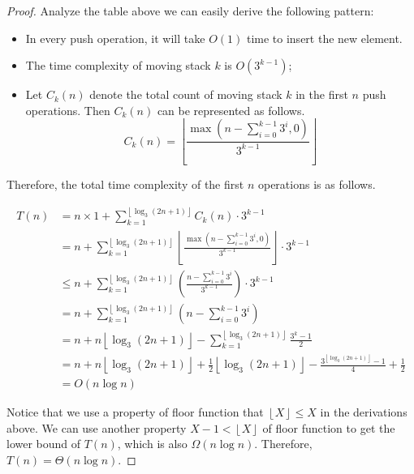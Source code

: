 \documentclass[12pt,a4paper]{article}
\theoremstyle{definition}
\begin{document}
\begin{enumerate}
\begin{enumerate}
\begin{proof}
        Analyze the table above we can easily derive the following pattern:
        \begin{itemize}
        \item In every push operation, it will take $O(1)$ time to insert the new element.
        \item The time complexity of moving stack $k$ is $O(3^{k-1})$;
        \item Let $C_k(n)$ denote the total count of moving stack $k$ in the first $n$ push operations. Then $C_k(n)$ can be represented as follows.
        \begin{displaymath}
        C_k(n) = \left\lfloor \frac{\max(n - \sum_{i=0}^{k-1} 3^i, 0)}{3^{k-1}} \right\rfloor
        \end{displaymath}
        \end{itemize}
        Therefore, the total time complexity of the first $n$ operations is as follows.

        \begin{displaymath}
        \begin{aligned}
        T(n) &= n \times 1 + \sum_{k=1}^{\left\lfloor \log_3{(2n+1)} \right\rfloor}C_k(n) \cdot 3^{k-1} \\
             &= n + \sum_{k=1}^{\left\lfloor \log_3{(2n+1)} \right\rfloor}\left\lfloor \frac{\max(n - \sum_{i=0}^{k-1} 3^i, 0)}{3^{k-1}} \right\rfloor \cdot 3^{k-1} \\
             &\leq n + \sum_{k=1}^{\left\lfloor \log_3{(2n+1)} \right\rfloor}\left( \frac{n - \sum_{i=0}^{k-1} 3^i}{3^{k-1}} \right) \cdot 3^{k-1} \\
             &= n + \sum_{k=1}^{\left\lfloor \log_3{(2n+1)} \right\rfloor}{\left(n - \sum_{i=0}^{k-1} 3^i\right)} \\
             &= n + n \left\lfloor \log_3{(2n+1)} \right\rfloor - \sum_{k=1}^{\left\lfloor \log_3{(2n+1)} \right\rfloor} \frac{3^k - 1}{2} \\
             &= n + n \left\lfloor \log_3{(2n+1)} \right\rfloor + \frac{1}{2} \left\lfloor \log_3{(2n+1)} \right\rfloor - \frac{3^{\left\lfloor \log_3{(2n+1)} \right\rfloor} - 1}{4} + \frac{1}{2} \\
             &= O(n \log{n})
        \end{aligned}
        \end{displaymath}

        Notice that we use a property of floor function that $\left\lfloor X \right\rfloor \leq X$ in the derivations above. We can use another property $X-1 < \left\lfloor X \right\rfloor$ of floor function to get the lower bound of $T(n)$, which is also $\Omega(n \log{n})$. Therefore, $T(n) = \Theta(n \log{n})$.


\end{proof}
\end{enumerate}
\end{enumerate}
\end{document}
